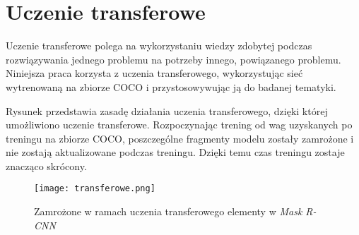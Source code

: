\newpage
\section{Uczenie transferowe}
\label{sec:uczenie-transferowe}

Uczenie transferowe polega na wykorzystaniu wiedzy zdobytej podczas rozwiązywania jednego problemu na potrzeby innego, powiązanego problemu.
Niniejsza praca korzysta z uczenia transferowego, wykorzystując sieć wytrenowaną na zbiorze COCO \cite{coco} i przystosowywując ją do badanej tematyki.

Rysunek  przedstawia zasadę działania uczenia transferowego, dzięki której umożliwiono uczenie transferowe. Rozpoczynając trening od wag uzyskanych po treningu na zbiorze COCO, poszczególne fragmenty modelu zostały zamrożone i nie zostają aktualizowane podczas treningu. Dzięki temu czas treningu zostaje znacząco skrócony.

\begin{figure}[h]
  \centering
  \texttt{[image: transferowe.png]}
  \caption{Zamrożone w ramach uczenia transferowego elementy w \textit{Mask R-CNN}}
  \label{fig:transferowe}
\end{figure}
